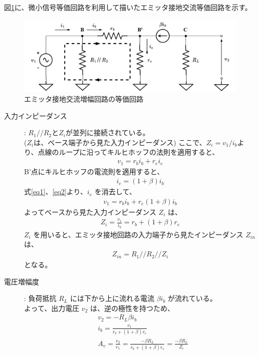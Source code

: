 図\ref{emit_touka}に、微小信号等価回路を利用して描いたエミッタ接地交流等価回路を示す。

\begin{figure}[htbp]
  \begin{center}
  \includegraphics[width=0.8\linewidth]{img/48.pdf}
  \caption{エミッタ接地交流増幅回路の等価回路}
  \label{emit_touka}
  \end{center}
\end{figure}

\begin{description}
  \item [入力インピーダンス]: $R_1//R_2$と$Z_i$が並列に接続されている。\\
  ($Z_i$は、ベース端子から見た入力インピーダンス)
  ここで、$Z_i = v_1/i_b$より、点線のループに沿ってキルヒホッフの法則を適用すると、
  \begin{align}
    v_1 = r_bi_b+r_ei_e \label{eq1}
  \end{align}
  B'点にキルヒホッフの電流則を適用すると、
  \begin{align}
    i_e = (1+\beta)i_b \label{eq2}
  \end{align}
  式\eqref{eq1}、\eqref{eq2}より、$i_e$ を消去して、
  \begin{align}
    v_1 = r_bi_b+r_e(1+\beta)i_b
  \end{align}
よってベースから見た入力インピーダンス $Z_i$ は、
  \begin{align}
    Z_i = \frac{v_1}{i_b} = r_b+(1+\beta)r_e
  \end{align}
$Z_i$ を用いると、エミッタ接地回路の入力端子から見たインピーダンス $Z_{in}$ は、
  \begin{align}
    Z_{in} = R_1//R_2//Z_i
  \end{align}
となる。
  \item [電圧増幅度]: 負荷抵抗 $R_L$ には下から上に流れる電流 $\beta i_b$ が流れている。\\
  よって、出力電圧 $v_2$ は、逆の極性を持つため、
  \begin{align}
    & v_2 = - R_L\beta i_b\\
    & i_b = \frac{v_1}{r_b+(1+\beta)r_e}\\
    & A_v = \frac{v_2}{v_1} = \frac{-\beta R_L}{r_b+(1+\beta)r_e} = \frac{-\beta R_L}{Z_i}    
  \end{align}

\end{description}

